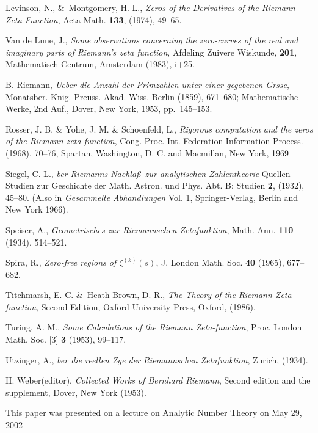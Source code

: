 \documentclass[a4paper]{amsart}
\numberwithin{equation}{section}
\begin{document}
\begin{thebibliography}{9}
Levinson, N., \&~Montgomery, H. L., {\em Zeros of the Derivatives of 
the Riemann Zeta-Function}, Acta Math. {\bf 133}, (1974), 49--65.

Van de Lune, J., {\em Some observations concerning the zero-curves of the
 real and imaginary parts of Riemann's zeta function},
Afdeling Zuivere Wiskunde, {\bf 201}, Mathematisch Centrum, Amsterdam 
(1983), i+25.

B. Riemann, {\em Ueber die Anzahl der Primzahlen unter einer gegebenen Grsse},
Monatsber. Knig. Preuss. Akad. Wiss. Berlin (1859), 671--680; Mathematische Werke, 2nd
Auf., Dover, New York, 1953, pp.~145--153.

Rosser, J. B. \& Yohe, J. M. \& Schoenfeld, L., 
{\em Rigorous computation and the zeros of the Riemann zeta-function}, 
Cong. Proc. Int. Federation Information Process. 
(1968), 70--76, Spartan, Washington, D. C. and Macmillan, New York, 
1969








Siegel, C. L.,  {\em ber Riemanns Nachla\ss~zur analytischen Zahlentheorie}
Quellen Studien zur Geschichte der Math. Astron. und Phys. Abt. B: Studien {\bf 2},
(1932), 45--80. (Also in {\em Gesammelte Abhandlungen} Vol. 1, Springer-Verlag, Berlin
and New York 1966). 

Speiser, A., {\em Geometrisches zur Riemannschen Zetafunktion}, Math. 
Ann. {\bf 110} (1934), 514--521.

Spira, R., {\em Zero-free regions of $\zeta^{(k)}(s)$}, J. London Math. 
Soc. {\bf 40} (1965), 677--682.

Titchmarsh, E. C. \&~Heath-Brown, D. R., {\em The Theory of the 
Riemann Zeta-function}, Second Edition, Oxford University Press, 
Oxford, (1986).

Turing, A. M., {\em Some Calculations of the Riemann Zeta-function}, 
Proc. London Math. Soc. [3] {\bf 3} (1953), 99--117.
% 

 Utzinger, A., {\em ber die reellen Zge der Riemannschen 
Zetafunktion}, Zurich, (1934).

H. Weber(editor), {\em Collected Works of Bernhard Riemann}, Second
edition and the supplement, Dover, New York (1953).





\end{thebibliography}

\vspace{3cm}

\noindent  This paper was presented on a lecture on Analytic Number Theory on 
   May 29, 2002

\vspace{4cm}
\end{document}
